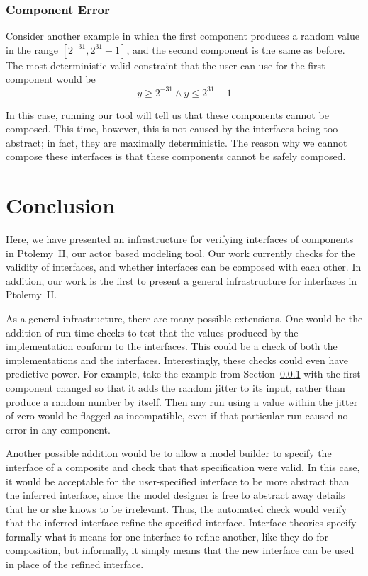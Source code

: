 \documentclass[preprint,11pt,authoryear]{sigplanconf}
\begin{document}
\subsubsection{Component Error} \label{sec:componentError}
Consider another example in which the first component produces a random value in the range $[2^{-31}, 2^{31}-1]$, and the second component is the same as before.
The most deterministic valid constraint that the user can use for the first component would be
\[
y \ge 2^{-31} \wedge y \le 2^{31}-1
\]

In this case, running our tool will tell us that these components cannot be composed.
This time, however, this is not caused by the interfaces being too abstract; in fact, they are maximally deterministic.
The reason why we cannot compose these interfaces is that these components cannot be safely composed.

\section{Conclusion}
Here, we have presented an infrastructure for verifying interfaces of components in Ptolemy~II, our actor based modeling tool.
Our work currently checks for the validity of interfaces, and whether interfaces can be composed with each other.
In addition, our work is the first to present a general infrastructure for interfaces in Ptolemy~II.

As a general infrastructure, there are many possible extensions.
One would be the addition of run-time checks to test that the values produced by the implementation conform to the interfaces.
This could be a check of both the implementations and the interfaces.
Interestingly, these checks could even have predictive power.
For example, take the example from Section~\ref{sec:componentError} with the first component changed so that it adds the random jitter to its input, rather than produce a random number by itself.
Then any run using a value within the jitter of zero would be flagged as incompatible, even if that particular run caused no error in any component.

Another possible addition would be to allow a model builder to specify the interface of a composite and check that that specification
were valid.
In this case, it would be acceptable for the user-specified interface to be more abstract than the inferred interface, since the model designer is free to abstract away details that he or she knows to be irrelevant.
Thus, the automated check would verify that the inferred interface refine the specified interface.
Interface theories specify formally what it means for one interface to refine another, like they do for composition, but informally, it simply means that the new interface can be used in place of the refined interface.
\end{document}
